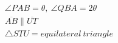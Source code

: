 \documentclass[preview]{standalone}
\begin{document}
\begin{align*}
\angle PAB=\theta,\ \angle QBA=2\theta \\ \overline{AB} \parallel \overline{UT} \\ \triangle STU = equilateral\ triangle
\end{align*}
\end{document}
